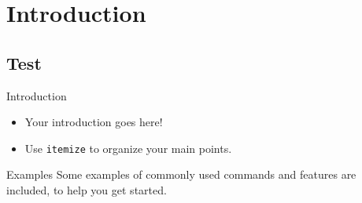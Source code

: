 \section{Introduction}
\subsection{Test}

\begin{frame}{Introduction}

\begin{itemize}
  \item Your introduction goes here!
  \item Use \texttt{itemize} to organize your main points.
\end{itemize}

\vskip 1cm

\begin{block}{Examples}
Some examples of commonly used commands and features are included, to help you get started.
\end{block}

\end{frame}